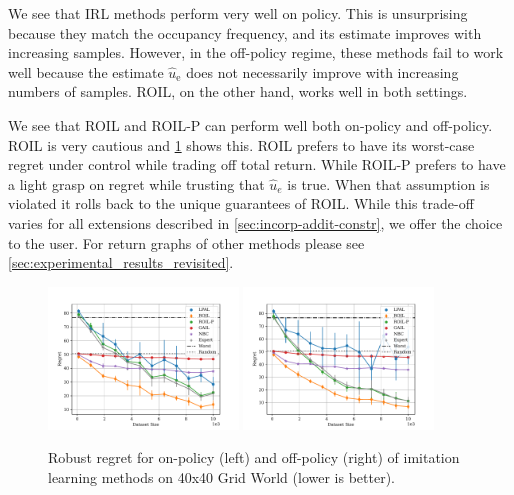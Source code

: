 \documentclass[10pt]{article}
\theoremstyle{plain}
\theoremstyle{remark}
\begin{document}
We see that IRL methods perform very well on policy. This is unsurprising because they match the occupancy frequency, and its estimate improves with increasing samples. However, in the off-policy regime, these methods fail to work well because the estimate $\hat{u}_{\mathrm{e}}$ does not necessarily improve with increasing numbers of samples. ROIL, on the other hand, works well in both settings. 

We see that ROIL and ROIL-P can perform well both on-policy and off-policy. ROIL is very cautious and \cref{fig:grid-regret} shows this. ROIL prefers to have its worst-case regret under control while trading off total return. While ROIL-P prefers to have a light grasp on regret while trusting that $\hat{u}_e$ is true. When that assumption is violated it rolls back to the unique guarantees of ROIL. While this trade-off varies for all extensions described in \cref{sec:incorp-addit-constr}, we offer the choice to the user. For return graphs of other methods please see \cref{sec:experimental_results_revisited}.

\begin{figure}
\centering 
\includegraphics[width=0.45\textwidth]{../src/plots/regrets/40x40_gridworld_on_policy_regret_regrets.pdf} 
\includegraphics[width=0.45\textwidth]{../src/plots/regrets/40x40_gridworld_off_policy_regret_regrets.pdf}
\caption{Robust regret for on-policy (left) and off-policy (right) of imitation learning methods on 40x40 Grid World (lower is better).}
\label{fig:grid-regret}
\end{figure}

\end{document}
